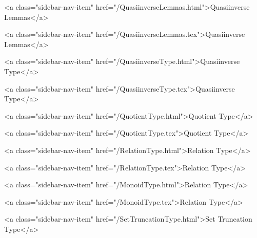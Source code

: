       
    
      
        
          <a class="sidebar-nav-item" href="/QuasiinverseLemmas.html">Quasiinverse Lemmas</a>
        
      
    
      
        
          <a class="sidebar-nav-item" href="/QuasiinverseLemmas.tex">Quasiinverse Lemmas</a>
        
      
    
      
        
          <a class="sidebar-nav-item" href="/QuasiinverseType.html">Quasiinverse Type</a>
        
      
    
      
        
          <a class="sidebar-nav-item" href="/QuasiinverseType.tex">Quasiinverse Type</a>
        
      
    
      
        
          <a class="sidebar-nav-item" href="/QuotientType.html">Quotient Type</a>
        
      
    
      
        
          <a class="sidebar-nav-item" href="/QuotientType.tex">Quotient Type</a>
        
      
    
      
        
          <a class="sidebar-nav-item" href="/RelationType.html">Relation Type</a>
        
      
    
      
        
          <a class="sidebar-nav-item" href="/RelationType.tex">Relation Type</a>
        
      
    
      
        
          <a class="sidebar-nav-item" href="/MonoidType.html">Relation Type</a>
        
      
    
      
        
          <a class="sidebar-nav-item" href="/MonoidType.tex">Relation Type</a>
        
      
    
      
        
          <a class="sidebar-nav-item" href="/SetTruncationType.html">Set Truncation Type</a>
        
